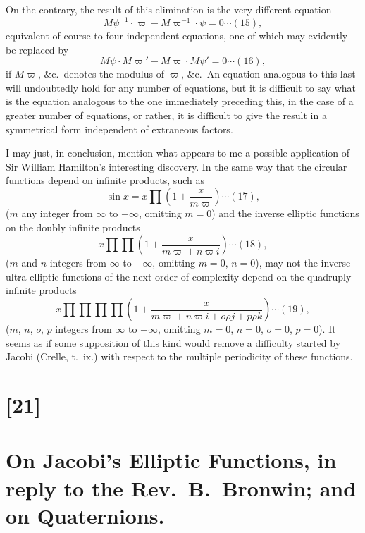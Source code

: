 \documentclass[11pt,a4paper]{book}
\begin{document}
On the contrary, the result of this elimination is the very different equation
\begin{equation}
M\psi^{-1} \cdot \varpi - M\varpi^{-1} \cdot \psi = 0 \cdots (15),
\end{equation}
equivalent of course to four independent equations, one of which may evidently be
replaced by
\begin{equation}
M\psi \cdot M\varpi' - M\varpi \cdot M\psi' = 0 \cdots (16),
\end{equation}
if $M\varpi$, \&c.\ denotes the modulus of $\varpi$, \&c.\ An equation analogous to this last will
undoubtedly hold for any number of equations, but it is difficult to say what is the
equation analogous to the one immediately preceding this, in the case of a greater
number of equations, or rather, it is difficult to give the result in a symmetrical form
independent of extraneous factors.

I may just, in conclusion, mention what appears to me a possible application of
Sir William Hamilton's interesting discovery. In the same way that the circular
functions depend on infinite products, such as
\begin{equation}
\sin x = x \prod \left(1 + \frac{x}{m\varpi}\right) \cdots (17),
\end{equation}
($m$ any integer from $\infty$ to $-\infty$, omitting $m = 0$)
and the inverse elliptic functions on the doubly infinite products
\begin{equation}
x \prod \prod \left(1 + \frac{x}{m\varpi + n\varpi i}\right) \cdots (18),
\end{equation}
($m$ and $n$ integers from $\infty$ to $-\infty$, omitting $m = 0$, $n = 0$),
may not the inverse ultra-elliptic functions of the next order of complexity depend on
the quadruply infinite products
\begin{equation}
x \prod \prod \prod \prod \left(1 + \frac{x}{m\varpi + n\varpi i + o\rho j + p\rho k}\right) \cdots (19),
\end{equation}
($m$, $n$, $o$, $p$ integers from $\infty$ to $-\infty$, omitting $m = 0$, $n = 0$, $o = 0$, $p = 0$).
It seems as if some supposition of this kind would remove a difficulty started by
Jacobi (Crelle, t.~ix.) with respect to the multiple periodicity of these functions.

\newpage
\section*{[21]}
\section*{On Jacobi's Elliptic Functions, in reply to the Rev.~B.~Bronwin; and on Quaternions.}
\end{document}
